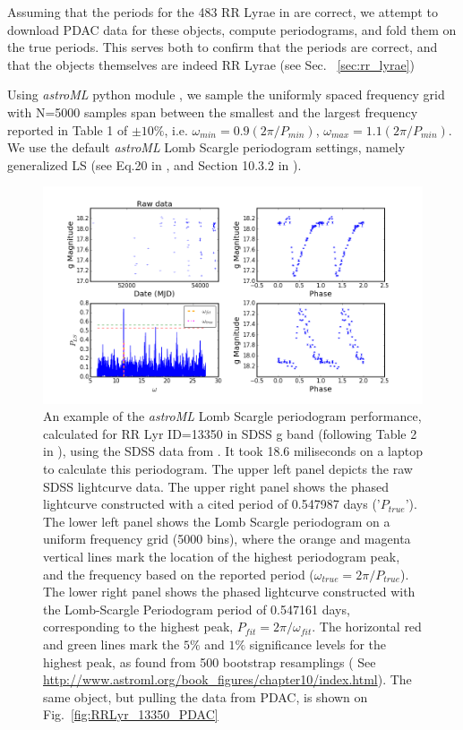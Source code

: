 \documentclass[fleqn,usenatbib]{mnras} %
\begin{document}
Assuming that the periods for the 483 RR Lyrae  in \cite{sesar2010} are correct, we attempt to download PDAC data for these objects, compute periodograms, and fold them on the true periods.  This serves both to confirm that the periods are correct, and that the objects themselves are indeed RR Lyrae (see Sec. ~\ref{sec:rr_lyrae})



 Using {\it astroML} python module \citep{astroML}, we sample the uniformly spaced frequency grid with N=5000 samples span between the smallest and the largest frequency reported in Table 1 of \cite{sesar2010} $\pm 10\%$, i.e. $\omega_{min} = 0.9 ( 2 \pi / P_{min})$, $\omega_{max} = 1.1 ( 2 \pi / P_{min})$. We use the default {\it astroML} Lomb Scargle periodogram settings, namely generalized LS (see Eq.20 in \cite{zechmeister2009}, and Section 10.3.2 in \cite{ivezic2014}).   



\begin{figure}
\includegraphics[width=\textwidth]{figs/Fig_2_RRLyr_LS_periodogram_ID_13350_g}
\caption{ An example of the  {\it astroML} Lomb Scargle periodogram performance,  calculated for RR Lyr ID=13350  in SDSS g band (following Table 2 in \citep{sesar2010}), using the SDSS data from \citep{sesar2010}.  It took 18.6 miliseconds on a laptop to calculate this periodogram. The upper left panel depicts the raw  SDSS lightcurve data. The upper right panel shows the phased lightcurve constructed with a cited period of 0.547987 days ('$P_{true}$'). The lower left panel shows the Lomb Scargle periodogram on  a uniform frequency grid (5000 bins), where the orange and magenta vertical lines mark the location of the highest periodogram peak, and the frequency based on the reported period ($\omega_{true} = 2 \pi / P_{true}$). The lower right panel shows the phased lightcurve constructed with the Lomb-Scargle Periodogram period of 0.547161 days,  corresponding to the highest peak, $P_{fit} = 2 \pi / \omega_{fit}$. The horizontal red and green lines mark the $5\%$ and $1\%$  significance levels for the highest peak, as found from 500 bootstrap resamplings ( See \url{http://www.astroml.org/book\_figures/chapter10/index.html}). The same object, but pulling the data from PDAC, is shown on Fig.~\ref{fig:RRLyr_13350_PDAC} }
\label{fig:RRLyr_13350_Sesar}
\end{figure}
\end{document}
